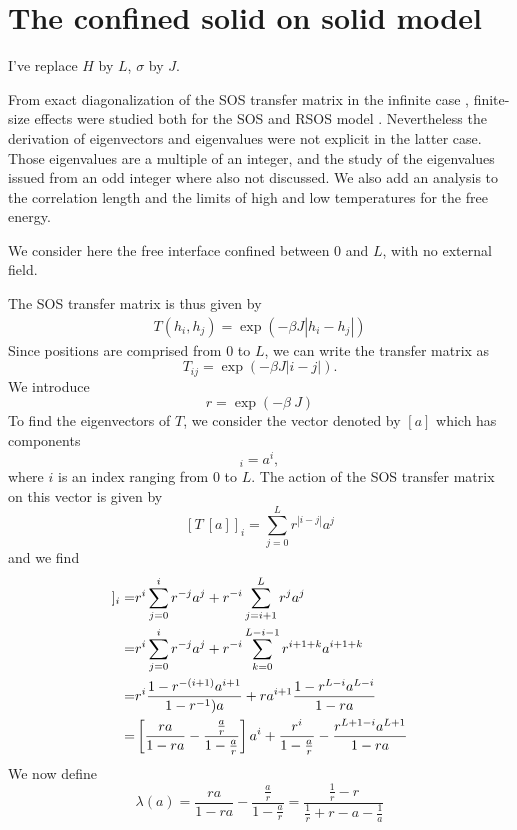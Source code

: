 \section{The confined solid on solid model}
{\color{red} I've replace $H$ by $L$, $\sigma$ by $J$.}
{\color{blue}
From exact diagonalization of the SOS transfer matrix in the infinite case \cite{guyer_sine-gordon_1979}, finite-size effects were studied both for the SOS and RSOS model \cite{svrakic_finite-size_1988,privman_finite-size_1988}. Nevertheless the derivation of eigenvectors and eigenvalues were not explicit in the latter case. Those eigenvalues are a multiple of an integer, and the study of the eigenvalues issued from an odd integer where also not discussed. We also add an analysis to the correlation length and the limits of high and low temperatures for the free energy. 

We consider here the free interface confined between $0$ and $L$, with no external field.} {\color{red} The SOS transfer matrix is thus given by 
\begin{align}
T(h_i,h_j) = \exp(-\beta J |h_i-h_j|)
\end{align}
Since positions are comprised from $0$ to $L$, we can write the transfer matrix as}
\begin{equation}
T_{ij} = \exp(-\beta J|i-j|).
\end{equation}
We introduce 
\begin{equation}
r=\exp(-\beta\ J)
\end{equation}
To find the eigenvectors of $T$, we consider the vector denoted by $[a]$ which has components
\begin{equation}
[a]_i = a^i,
\end{equation}
where $i$ is an index ranging from $0$ to $L$. 
The action of the SOS transfer matrix on this vector is given by
\begin{equation}
\left[T\ [a]\right]_i = \sum_{j=0}^L r^{ |i-j|} a^j
\end{equation}
and we find
\begin{align}
[T\ [a]]_i
=& r^i \sum_{j=0}^i r^{-j} a^j + r^{-i} \sum_{j= i+1}^L r^j a^j \nn
=& r^i \sum_{j=0}^i r^{-j} a^j + r^{-i} \sum_{k= 0}^{L-i-1} r^{i+1+k} a^{i+1+k} \nn
=& r^i \frac{1- r^{-(i+1)} a^{i+1}}{1- r^{-1} )a} + r a^{i+1}\frac{1- r^{L-i} a^{L-i}}{1- r a} \nn
=&\left[\frac{ ra}{1-ra}- \frac{ \frac{a}{r}}{1-\frac{a}{r}}\right]a^i +\frac{r^i}{1-\frac{a}{r}}-\frac{r^{L+1-i}a^{L+1}}{1-ra}
\end{align}
We now define
\begin{equation}
\lambda(a)= \frac{ ra}{1-ra}- \frac{ \frac{a}{r}}{1-\frac{a}{r}} = \frac{\frac{1}{r}-r}{\frac{1}{r}+r
- a-\frac{1}{a}}
\label{elam}
\end{equation}
